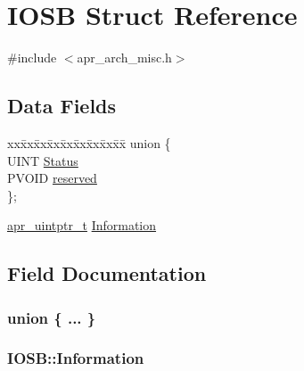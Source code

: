 \hypertarget{structIOSB}{}\section{I\+O\+SB Struct Reference}
\label{structIOSB}


{\ttfamily \#include $<$apr\+\_\+arch\+\_\+misc.\+h$>$}

\subsection*{Data Fields}
\begin{DoxyCompactItemize}
\item 
\begin{tabbing}
xx\=xx\=xx\=xx\=xx\=xx\=xx\=xx\=xx\=\kill
union \{\\
\>UINT \hyperlink{structIOSB_a2b17ec69f3b2eeec3baa6e195c117e2b}{Status}\\
\>PVOID \hyperlink{structIOSB_a50a5f9c7d027d0d1e977a73bad18a9b8}{reserved}\\
\}; \\

\end{tabbing}\item 
\hyperlink{group__apr__platform_gabf3268b941400de57926ee0f0ca56aa2}{apr\+\_\+uintptr\+\_\+t} \hyperlink{structIOSB_a1c8dfe078826b45807192e0a81211213}{Information}
\end{DoxyCompactItemize}


\subsection{Field Documentation}
\subsubsection[{\texorpdfstring{"@36}{@36}}]{\setlength{\rightskip}{0pt plus 5cm}union \{ ... \} }\hypertarget{structIOSB_aabbbff648ba5f4c35241968d0b4a1664}{}\label{structIOSB_aabbbff648ba5f4c35241968d0b4a1664}
\subsubsection[{\texorpdfstring{Information}{Information}}]{ I\+O\+S\+B\+::\+Information}\hypertarget{structIOSB_a1c8dfe078826b45807192e0a81211213}{}\label{structIOSB_a1c8dfe078826b45807192e0a81211213}
